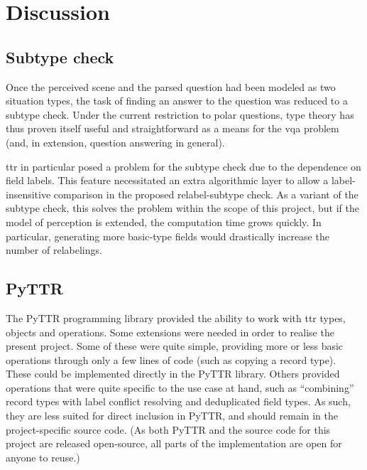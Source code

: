 \renewcommand{\sectionautorefname}{Section}
\let\subsectionautorefname\sectionautorefname
\let\subsubsectionautorefname\sectionautorefname
\section{Discussion}
\label{sec:discussion}



\subsection{Subtype check}
\label{sec:discussion-subtype}

Once the perceived scene and the parsed question had been modeled as two situation types, the task of finding an answer to the question was reduced to a subtype check.
Under the current restriction to polar questions, type theory has thus proven itself useful and straightforward as a means for the \gls{vqa} problem (and, in extension, question answering in general).

\gls{ttr} in particular posed a problem for the subtype check due to the dependence on field labels.
This feature necessitated an extra algorithmic layer to allow a label-insensitive comparison in the proposed relabel-subtype check.
As a variant of the subtype check, this solves the problem within the scope of this project, but if the model of perception is extended, the computation time grows quickly.
In particular, generating more basic-type fields would drastically increase the number of relabelings.



\subsection{PyTTR}
\label{sec:discussion-pyttr}

The PyTTR programming library provided the ability to work with \gls{ttr} types, objects and operations.
Some extensions were needed in order to realise the present project.
Some of these were quite simple, providing more or less basic operations through only a few lines of code (such as copying a record type).
These could be implemented directly in the PyTTR library.
Others provided operations that were quite specific to the use case at hand, such as ``combining'' record types with label conflict resolving and deduplicated field types.
As such, they are less suited for direct inclusion in PyTTR, and should remain in the project-specific source code.
(As both PyTTR and the source code for this project are released open-source, all parts of the implementation are open for anyone to reuse.)



